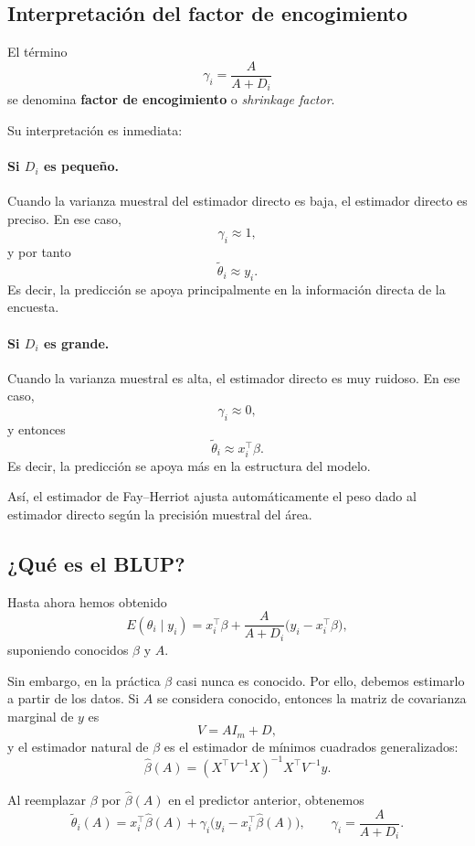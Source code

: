 \subsection{Interpretación del factor de encogimiento}

El término
\[
\gamma_i=\frac{A}{A+D_i}
\]
se denomina \textbf{factor de encogimiento} o \textit{shrinkage factor}.

Su interpretación es inmediata:

\paragraph{Si $D_i$ es pequeño.}
Cuando la varianza muestral del estimador directo es baja, el estimador directo es preciso. En ese caso,
\[
\gamma_i \approx 1,
\]
y por tanto
\[
\tilde{\theta}_i \approx y_i.
\]
Es decir, la predicción se apoya principalmente en la información directa de la encuesta.

\paragraph{Si $D_i$ es grande.}
Cuando la varianza muestral es alta, el estimador directo es muy ruidoso. En ese caso,
\[
\gamma_i \approx 0,
\]
y entonces
\[
\tilde{\theta}_i \approx x_i^{\top}\beta.
\]
Es decir, la predicción se apoya más en la estructura del modelo.

Así, el estimador de Fay--Herriot ajusta automáticamente el peso dado al estimador directo según la precisión muestral del área.

\subsection{¿Qué es el BLUP?}

Hasta ahora hemos obtenido
\[
E(\theta_i\mid y_i)
=
x_i^{\top}\beta
+
\frac{A}{A+D_i}\bigl(y_i-x_i^{\top}\beta\bigr),
\]
suponiendo conocidos $\beta$ y $A$.

Sin embargo, en la práctica $\beta$ casi nunca es conocido. Por ello, debemos estimarlo a partir de los datos. Si $A$ se considera conocido, entonces la matriz de covarianza marginal de $y$ es
\[
V=AI_m+D,
\]
y el estimador natural de $\beta$ es el estimador de mínimos cuadrados generalizados:
\[
\hat{\beta}(A)=
(X^{\top}V^{-1}X)^{-1}X^{\top}V^{-1}y.
\]

Al reemplazar $\beta$ por $\hat{\beta}(A)$ en el predictor anterior, obtenemos
\[
\tilde{\theta}_i(A)
=
x_i^{\top}\hat{\beta}(A)
+
\gamma_i\bigl(y_i-x_i^{\top}\hat{\beta}(A)\bigr),
\qquad
\gamma_i=\frac{A}{A+D_i}.
\]


